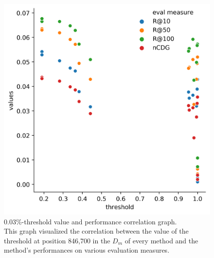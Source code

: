 \begin{figure}[h]
    \centering
	\includegraphics[width=1\linewidth]{./img/nn_threshold_performance_correlation.png}
	\caption[0.03\%-threshold value and performance correlation graph]{0.03\%-threshold value and performance correlation graph. \\ This graph visualized the correlation between the value of the threshold at position 846,700 in the $D_m$ of every method and the method's performances on various evaluation measures.}
	\label{fig:threshold_correlation_graph}
\end{figure}




